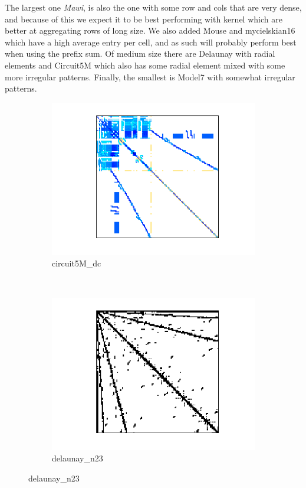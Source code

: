\documentclass[conference]{IEEEtran}
\begin{document}
The largest one \textit{Mawi}, is also the one with some row and cols that are very dense, and because of this we expect it to be best performing with kernel which are better at aggregating rows of long size. We also added Mouse and mycielskian16 which have a high average entry per cell, and as such will probably perform best when using the prefix sum. Of medium size there are Delaunay with radial elements and Circuit5M which also has some radial element mixed with some more irregular patterns. Finally, the smallest is Model7 with somewhat irregular patterns.
\FloatBarrier
\begin{figure}[h!]
	\centering


	\begin{subfigure}{0.40\linewidth}
		\centering
		\includegraphics[width=\linewidth]{model_images/circuit5M_dc}
		\caption{circuit5M\_dc}
		\label{dat:circuit5M_dc}
	\end{subfigure}
	~
	\begin{subfigure}{0.40\linewidth}
		\centering
		\includegraphics[width=\linewidth]{model_images/delaunay_n23}
		\caption{delaunay\_n23}
		\label{dat:delaunay_n23}
	\end{subfigure}


\end{figure}
\end{document}
